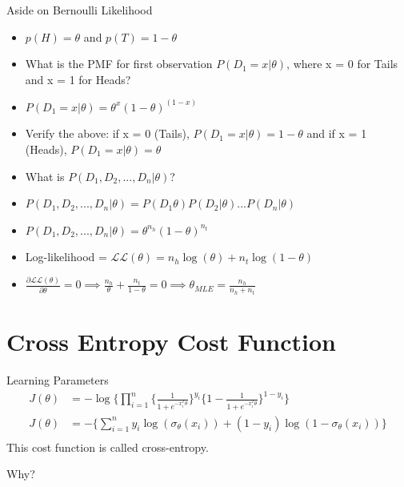 \documentclass{beamer}
\begin{document}
\begin{frame}{Aside on Bernoulli Likelihood}
\begin{itemize}[<+->]
\item $p(H) = \theta$ and $p(T) = 1 - \theta$
\item What is the PMF for first observation $P(D_1 = x|\theta)$, where x = 0 for Tails and x = 1 for Heads?
\item $P(D_1 = x|\theta) = \theta^x(1-\theta)^{(1-x)}$
\item Verify the above: if x = 0 (Tails), $P(D_1 = x|\theta) = 1 - \theta$ and if x = 1 (Heads), $P(D_1 = x|\theta)  = \theta$
\item What is $P(D_1, D_2, ..., D_n|\theta)$?
\item $P(D_1, D_2, ..., D_n|\theta) = P(D_1\theta)P(D_2|\theta)...P(D_n|\theta)$
\item $P(D_1, D_2, ..., D_n|\theta) =\theta^{n_h}(1-\theta)^{n_t}$
\item Log-likelihood = $\mathcal{LL}(\theta) = n_h\log(\theta) + n_t\log(1-\theta)$
\item $\frac{\partial \mathcal{LL}(\theta)}{\partial \theta} = 0 \implies \frac{n_h}{\theta} + \frac{n_t}{1-\theta} = 0 \implies \theta_{MLE} = \frac{n_h}{n_h + n_t}$

\end{itemize}

\end{frame}

\section{Cross Entropy Cost Function}
\begin{frame}{Learning Parameters}
\begin{align*}
J(\theta) &= -\log \bigg\{\prod_{i=1}^{n} \Big\{\frac{1}{1 + e^{-x_{i}^T\theta}}\Big\}^{y_{i}}\Big\{1 - \frac{1}{1 + e^{-x_{i}^T\theta}}\Big\}^{1 - y_{i}}\bigg\}\\
J(\theta) &= -\bigg\{\sum_{i=1}^{n} y_{i} \log(\sigma_{\theta}(x_{i})) + (1 - y_{i})\log(1 - \sigma_{\theta}(x_{i}))\bigg\} \\
\end{align*}
\pause This cost function is called cross-entropy.

\pause Why?
\end{frame}
\end{document}
